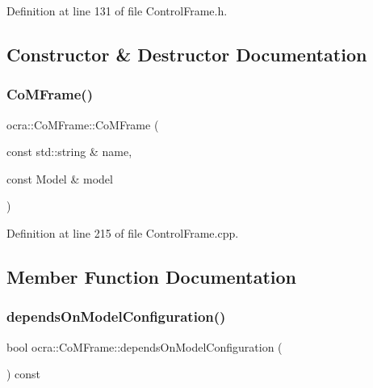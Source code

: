 Definition at line 131 of file Control\+Frame.\+h.



\subsection{Constructor \& Destructor Documentation}
\hypertarget{classocra_1_1CoMFrame_a0b9177034d13b851238da7edfadcdf38}{}\label{classocra_1_1CoMFrame_a0b9177034d13b851238da7edfadcdf38} 
\subsubsection{\texorpdfstring{Co\+M\+Frame()}{CoMFrame()}}
{\footnotesize\ttfamily ocra\+::\+Co\+M\+Frame\+::\+Co\+M\+Frame (\begin{DoxyParamCaption}\item[{const std\+::string \&}]{name,  }\item[{const Model \&}]{model }\end{DoxyParamCaption})}



Definition at line 215 of file Control\+Frame.\+cpp.



\subsection{Member Function Documentation}
\hypertarget{classocra_1_1CoMFrame_aaae3fd05da2f9e301dbe1c54b57fe624}{}\label{classocra_1_1CoMFrame_aaae3fd05da2f9e301dbe1c54b57fe624} 
\subsubsection{\texorpdfstring{depends\+On\+Model\+Configuration()}{dependsOnModelConfiguration()}}
{\footnotesize\ttfamily bool ocra\+::\+Co\+M\+Frame\+::depends\+On\+Model\+Configuration (\begin{DoxyParamCaption}{ }\end{DoxyParamCaption}) const\hspace{0.3cm}{\ttfamily [virtual]}}



